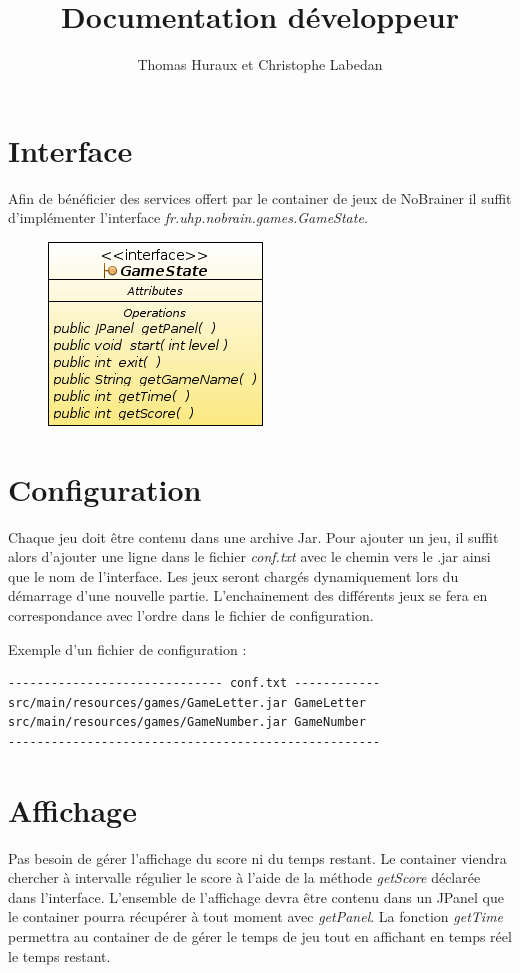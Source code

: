 \documentclass[a4paper,12pt]{article} %
\title{Documentation d\'eveloppeur}
\author{Thomas Huraux et Christophe Labedan}
\date{}
\begin{document}
\maketitle

\section*{Interface}
Afin de b\'en\'eficier des services offert par le container de jeux de NoBrainer il suffit d'impl\'ementer l'interface \emph{fr.uhp.nobrain.games.GameState}.

\begin{figure}[htbp]
\centering
 \includegraphics[width=.25\linewidth]{GameStateInterfaceDiagram.png}
\end{figure}

\section*{Configuration}
Chaque jeu doit \^etre contenu dans une archive Jar. Pour ajouter un jeu, il suffit alors d'ajouter une ligne dans le fichier \emph{conf.txt} avec le chemin vers le .jar ainsi que le nom de l'interface. Les jeux seront charg\'es dynamiquement lors du d\'emarrage d'une nouvelle partie. L'enchainement des diff\'erents jeux se fera en correspondance avec l'ordre dans le fichier de configuration.

Exemple d'un fichier de configuration :
\begin{center}
 \begin{verbatim}
------------------------------ conf.txt ------------
src/main/resources/games/GameLetter.jar GameLetter
src/main/resources/games/GameNumber.jar GameNumber
----------------------------------------------------
 \end{verbatim}
\end{center}

\section*{Affichage}
Pas besoin de g\'erer l'affichage du score ni du temps restant. Le container viendra chercher \`a intervalle r\'egulier le score \`a l'aide de la m\'ethode \emph{getScore} d\'eclar\'ee dans l'interface. L'ensemble de l'affichage devra \^etre contenu dans un JPanel que le container pourra r\'ecup\'erer \`a tout moment avec \emph{getPanel}. La fonction \emph{getTime} permettra au container de de g\'erer le temps de jeu tout en affichant en temps r\'eel le temps restant.
\end{document}
